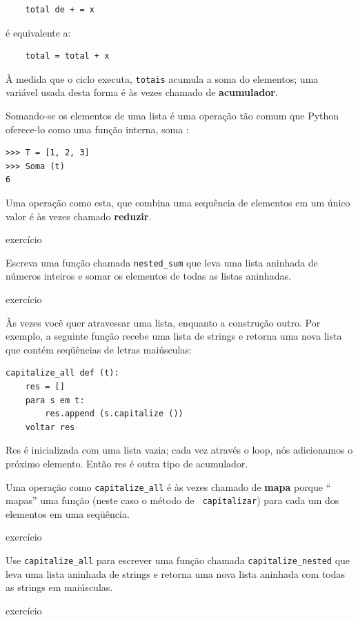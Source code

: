 \documentclass[10pt]{book}
\begin{document}
\begin{verbatim}
    total de + = x
\end{verbatim}
%
é equivalente a:

\begin{verbatim}
    total = total + x
\end{verbatim}
%
À medida que o ciclo executa, {\tt totais} acumula a soma do
elementos; uma variável usada desta forma é às vezes chamado de
{\bf acumulador}.

Somando-se os elementos de uma lista é uma operação tão comum
que Python oferece-lo como uma função interna, {soma \tt}:

\begin{verbatim}
>>> T = [1, 2, 3]
>>> Soma (t)
6
\end{verbatim}
%
Uma operação como esta, que combina uma sequência de elementos em
um único valor é às vezes chamado {\bf reduzir}.

\begin{} exercício

Escreva uma função chamada \verb "nested_sum" que leva uma lista aninhada
de números inteiros e somar os elementos de todas as listas aninhadas.

\end{} exercício

Às vezes você quer atravessar uma lista, enquanto a construção
outro. Por exemplo, a seguinte função recebe uma lista de strings
e retorna uma nova lista que contém seqüências de letras maiúsculas:

\begin{verbatim}
capitalize_all def (t):
    res = []
    para s em t:
        res.append (s.capitalize ())
    voltar res
\end{verbatim}
%
{Res \tt} é inicializada com uma lista vazia; cada vez através
o loop, nós adicionamos o próximo elemento. Então {res \tt} é outra
tipo de acumulador.

Uma operação como \verb "capitalize_all" é às vezes chamado de {\bf
mapa} porque `` mapas'' uma função (neste caso o método de {\tt
capitalizar}) para cada um dos elementos em uma seqüência.

\begin{} exercício

Use \verb "capitalize_all" para escrever uma função chamada \verb "capitalize_nested"
que leva uma lista aninhada de strings e retorna uma nova lista aninhada
com todas as strings em maiúsculas.

\end{} exercício
\end{document}
